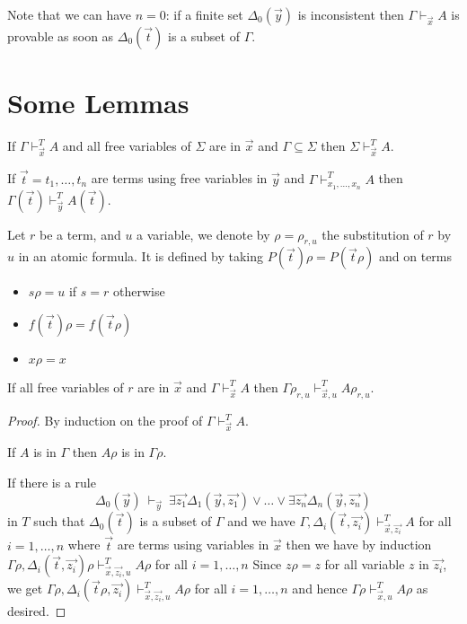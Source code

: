 \documentclass[10pt,a4paper]{article}
\begin{document}
 Note that we can have $n=0$: if a finite set $\Delta_0(\vec{y})$ is inconsistent
then $\Gamma\vdash_{\vec{x}} A$ is provable as soon as $\Delta_0(\vec{t})$ is a subset of $\Gamma$.


\section{Some Lemmas}


\begin{lemma}\label{weak}
If $\Gamma\vdash_{\vec{x}}^T A$ and all free variables of $\Sigma$ are in $\vec{x}$ and
$\Gamma\subseteq \Sigma$ then $\Sigma\vdash_{\vec{x}}^T A$.
\end{lemma}

\begin{lemma}\label{subst1}
If $\vec{t} = t_1,\dots,t_n$ are terms using free variables in $\vec{y}$ and
$\Gamma\vdash_{x_1,\dots,x_n}^T A$ then $\Gamma(\vec{t})\vdash_{\vec{y}}^T A(\vec{t})$.
\end{lemma}

 Let $r$ be a term, and $u$ a variable, we denote by $\rho = \rho_{r,u}$ the substitution of $r$ by $u$
in an atomic formula. It is defined by taking $P(\vec{t})\rho = P(\vec{t}\rho)$ and
on terms
\begin{itemize}
\item $s\rho = u$ if $s = r$ otherwise
\item $f(\vec{t})\rho = f(\vec{t}\rho)$
\item $x\rho = x$
\end{itemize}

\begin{lemma}\label{subst2}
If all free variables of $r$ are in $\vec{x}$ and
$\Gamma\vdash_{\vec{x}}^T A$ then $\Gamma\rho_{r,u}\vdash_{\vec{x},u}^T A\rho_{r,u}$.
\end{lemma}

\begin{proof}
By induction on the proof of $\Gamma\vdash_{\vec{x}}^T A$.

If $A$ is in $\Gamma$ then $A\rho$ is in $\Gamma\rho$.

If there is a rule
$$
\Delta_0(\vec{y})~\vdash_{\vec{y}}~
\exists \vec{z_1}\Delta_1(\vec{y},\vec{z_1})\vee\dots\vee\exists \vec{z_n}\Delta_n(\vec{y},\vec{z_n})
$$
in $T$ such that $\Delta_0(\vec{t})$ is a subset of $\Gamma$ and
we have $\Gamma,\Delta_i(\vec{t},\vec{z_i})\vdash^T_{\vec{x},\vec{z_i}} A$ for all $i = 1,\dots,n$
where $\vec{t}$ are terms using variables in $\vec{x}$ then we have by induction
$\Gamma\rho,\Delta_i(\vec{t},\vec{z_i})\rho\vdash^T_{\vec{x},\vec{z_i},u} A\rho$ for all $i = 1,\dots,n$
Since $z\rho = z$ for all variable $z$ in $\vec{z_i}$, we get
$\Gamma\rho,\Delta_i(\vec{t}\rho,\vec{z_i})\vdash^T_{\vec{x},\vec{z_i},u} A\rho$ for all $i = 1,\dots,n$
and hence $\Gamma\rho\vdash^T_{\vec{x},u} A\rho$ as desired.
\end{proof}
\end{document}
